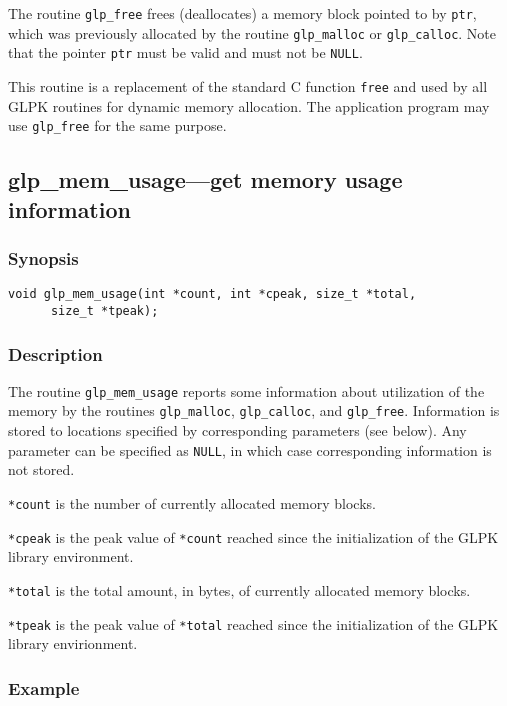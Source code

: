 The routine \verb|glp_free| frees (deallocates) a memory block pointed
to by \verb|ptr|, which was previously allocated by the routine
\verb|glp_malloc| or \verb|glp_calloc|. Note that the pointer \verb|ptr|
must be valid and must not be \verb|NULL|.

This routine is a replacement of the standard C function \verb|free|
and used by all GLPK routines for dynamic memory allocation. The
application program may use \verb|glp_free| for the same purpose.

\subsection{glp\_mem\_usage---get memory usage information}

\subsubsection*{Synopsis}

\begin{verbatim}
void glp_mem_usage(int *count, int *cpeak, size_t *total,
      size_t *tpeak);
\end{verbatim}

\subsubsection*{Description}

The routine \verb|glp_mem_usage| reports some information about
utilization of the memory by the routines \verb|glp_malloc|,
\verb|glp_calloc|, and \verb|glp_free|. Information is stored to
locations specified by corresponding parameters (see below). Any
parameter can be specified as \verb|NULL|, in which case corresponding
information is not stored.

\verb|*count| is the number of currently allocated memory blocks.

\verb|*cpeak| is the peak value of \verb|*count| reached since the
initialization of the GLPK library environment.

\verb|*total| is the total amount, in bytes, of currently allocated
memory blocks.

\verb|*tpeak| is the peak value of \verb|*total| reached since the
initialization of the GLPK library envirionment.

\subsubsection*{Example}

